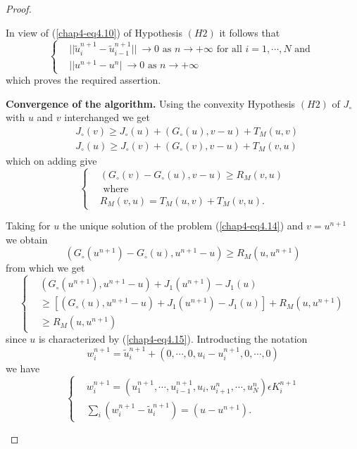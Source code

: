 \begin{proof}
\begin{step}
In view of (\ref{chap4-eq4.10}) of Hypothesis $(H2)$ it follows that
\begin{equation*}
\begin{cases}
& || \widetilde{u}_{i}^{n+1} - \widetilde{u}_{i-1}^{n+1} || \ \to 0 \text{ as } n \to + \infty \text{ for all } i = 1, \cdots, N \text{ and }\\
& || u^{n+1} - u^{n} |\ \to 0 \text{ as } n \to + \infty\tag{4.19}\label{chap4-eq4.19} 
\end{cases}
\end{equation*}\pageoriginale
which proves the required assertion.
\end{step}

\begin{step}\label{chap4-step5}
{\bf Convergence of the algorithm.} Using the convexity Hypothesis $(H2)$ of $J_{\circ}$ with $u$ and $v$ interchanged we get
\begin{align*}
& J_{\circ}(v) \geq J_{\circ}(u) + (G_{\circ}(u), v-u) + T_{M}(u, v)\\
& J_{\circ}(u) \geq J_{\circ}(v) + (G_{\circ}(v), v-u) + T_{M}(v, u)
\end{align*}
which on adding give
\begin{equation*}
\begin{cases}
& (G_{\circ}(v) - G_{\circ}(u), v-u) \geq R_{M} (v, u)\\
& \text{ where }\\
& R_{M} (v, u) = T_{M}(u, v) + T_{M} (v, u).\tag{4.20}\label{chap4-eq4.20}
\end{cases}
\end{equation*}

Taking for $u$ the unique solution of the problem (\ref{chap4-eq4.14}) and $v = u^{n+1}$ we obtain
$$
(G_{\circ} (u^{n+1}) - G_{\circ}(u), u^{n+1}-u) \geq R_{M} (u, u^{n+1})
$$ 
from which we get
\begin{equation*}
\begin{cases}
& (G_{\circ}(u^{n+1}), u^{n+1} - u) + J_{1} (u^{n+1}) - J_{1}(u)\\
& \geq [(G_{\circ}(u), u^{n+1}-u) + J_{1}(u^{n+1})-J_{1}(u)] + R_{M} (u, u^{n+1})\\
& \geq R_{M} (u, u^{n+1})\tag{4.21}\label{chap4-eq4.21}
\end{cases} 
\end{equation*}
since $u$ is characterized by (\ref{chap4-eq4.15}). Introducting the notation
$$
w_{i}^{n+1} = \widetilde{u}_{i}^{n+1} + (0, \cdots, 0, u_{i} - u_{i}^{n+1}, 0, \cdots, 0)
$$
we have
\begin{equation*}
\begin{cases}
& w_{i}^{n+1} = (u_{1}^{n+1}, \cdots, u_{i-1}^{n+1}, u_{i}, u_{i+1}^{n}, \cdots, u_{N}^{n}) \epsilon K_{i}^{n+1}\\
& \sum_{i} (w_{i}^{n+1} - \widetilde{u}_{i}^{n+1}) = (u-u^{n+1}).\tag{4.22}\label{chap4-eq4.22}
\end{cases}
\end{equation*}


\end{step}
\end{proof}
